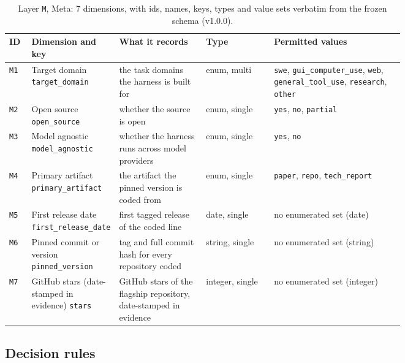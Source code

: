 \begin{table}[htbp]
\caption{Layer \texttt{M}, Meta: 7 dimensions, with ids, names, keys, types and value
sets verbatim from the frozen schema (v1.0.0).}
\label{tab:coding-M}
\footnotesize
\begin{tabular}{@{}l p{0.20\linewidth} p{0.22\linewidth} l p{0.33\linewidth}@{}}
\toprule
ID & Dimension and key & What it records & Type & Permitted values \tabularnewline
\midrule
\texttt{M1} & \raggedright Target domain \newline \texttt{target\_domain} & \raggedright the task domains the harness is built for & enum, multi & \raggedright \texttt{swe}, \texttt{gui\_computer\_use}, \texttt{web}, \texttt{general\_tool\_use}, \texttt{research}, \texttt{other} \tabularnewline
\texttt{M2} & \raggedright Open source \newline \texttt{open\_source} & \raggedright whether the source is open & enum, single & \raggedright \texttt{yes}, \texttt{no}, \texttt{partial} \tabularnewline
\texttt{M3} & \raggedright Model agnostic \newline \texttt{model\_agnostic} & \raggedright whether the harness runs across model providers & enum, single & \raggedright \texttt{yes}, \texttt{no} \tabularnewline
\texttt{M4} & \raggedright Primary artifact \newline \texttt{primary\_artifact} & \raggedright the artifact the pinned version is coded from & enum, single & \raggedright \texttt{paper}, \texttt{repo}, \texttt{tech\_report} \tabularnewline
\texttt{M5} & \raggedright First release date \newline \texttt{first\_release\_date} & \raggedright first tagged release of the coded line & date, single & \raggedright no enumerated set (date) \tabularnewline
\texttt{M6} & \raggedright Pinned commit or version \newline \texttt{pinned\_version} & \raggedright tag and full commit hash for every repository coded & string, single & \raggedright no enumerated set (string) \tabularnewline
\texttt{M7} & \raggedright GitHub stars (date-stamped in evidence) \newline \texttt{stars} & \raggedright GitHub stars of the flagship repository, date-stamped in evidence & integer, single & \raggedright no enumerated set (integer) \tabularnewline
\bottomrule
\end{tabular}
\end{table}

\subsection{Decision rules}
\label{subsec:coding-rules}

